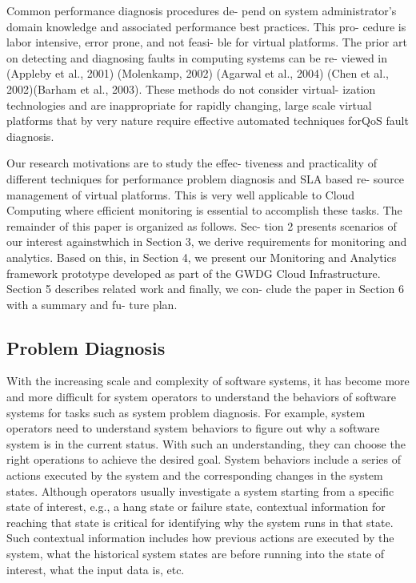 Common performance diagnosis procedures de-
pend on system administrator’s domain knowledge and associated performance best practices. This pro- cedure is labor intensive, error prone, and not feasi- ble for virtual platforms. The prior art on detecting and diagnosing faults in computing systems can be re- viewed in (Appleby et al., 2001) (Molenkamp, 2002) (Agarwal et al., 2004) (Chen et al., 2002)(Barham et al., 2003). These methods do not consider virtual- ization technologies and are inappropriate for rapidly changing, large scale virtual platforms that by very nature require effective automated techniques forQoS fault diagnosis.

Our research motivations are to study the effec-
tiveness and practicality of different techniques for performance problem diagnosis and SLA based re- source management of virtual platforms. This is very well applicable to Cloud Computing where efficient monitoring is essential to accomplish these tasks. The remainder of this paper is organized as follows. Sec- tion 2 presents scenarios of our interest againstwhich in Section 3, we derive requirements for monitoring and analytics. Based on this, in Section 4, we present our Monitoring and Analytics framework prototype developed as part of the GWDG Cloud Infrastructure. Section 5 describes related work and finally, we con- clude the paper in Section 6 with a summary and fu- ture plan.

\subsection{Problem Diagnosis}
With the increasing scale and complexity of software
systems, it has become more and more difficult for system operators to understand the behaviors of software systems for tasks such as system problem diagnosis. For example, system operators need to understand system behaviors to figure out why a software system is in the current status. With such an understanding, they can choose the right operations to achieve the desired goal. System behaviors include a series of actions executed by the system and the corresponding changes in the system states. Although operators usually investigate a system starting from a specific state of interest, e.g., a hang state or failure state, contextual information for reaching that state is critical for identifying why the system runs in that state. Such contextual information includes how previous actions are executed by the system, what the historical system states are before running into the state of interest, what the input data is, etc.

